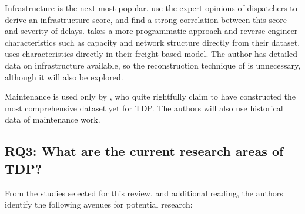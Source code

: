\documentclass{article}
\begin{document}
Infrastructure is the next most popular. \cite{markovic_et_al_2015} \cite{milinkovic_et_al_2013} use the expert opinions of dispatchers to derive an infrastructure score, and find a strong correlation between this score and severity of delays. \cite{nair_et_al_2019} takes a more programmatic approach and reverse engineer characteristics such as capacity and network structure directly from their dataset. \cite{barbour_et_al_2018} uses characteristics directly in their freight-based model. The author has detailed data on infrastructure available, so the reconstruction technique of \cite{nair_et_al_2019} is unnecessary, although it will also be explored. 

Maintenance is used only by \cite{nair_et_al_2019}, who quite rightfully claim to have constructed the most comprehensive dataset yet for TDP. The authors will also use historical data of maintenance work.

\subsection{RQ3: What are the current research areas of TDP?}

From the studies selected for this review, and additional reading, the authors identify the following avenues for potential research:
\end{document}
